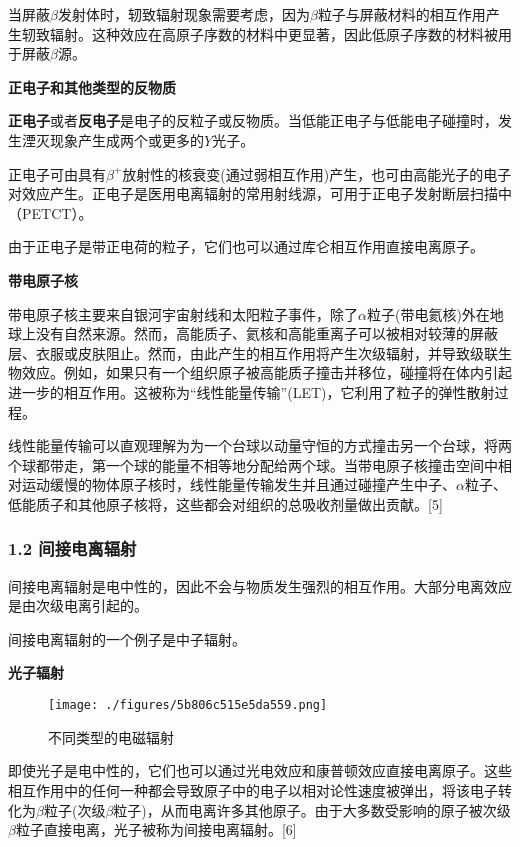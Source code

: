 当屏蔽$\beta$发射体时，轫致辐射现象需要考虑，因为$\beta$粒子与屏蔽材料的相互作用产生轫致辐射。这种效应在高原子序数的材料中更显著，因此低原子序数的材料被用于屏蔽$\beta$源。

\textbf{正电子和其他类型的反物质}

\textbf{正电子}或者\textbf{反电子}是电子的反粒子或反物质。当低能正电子与低能电子碰撞时，发生湮灭现象产生成两个或更多的$Y$光子。

正电子可由具有$\beta^+$放射性的核衰变(通过弱相互作用)产生，也可由高能光子的电子对效应产生。正电子是医用电离辐射的常用射线源，可用于正电子发射断层扫描中（PETCT）。

由于正电子是带正电荷的粒子，它们也可以通过库仑相互作用直接电离原子。

\textbf{带电原子核}

带电原子核主要来自银河宇宙射线和太阳粒子事件，除了$\alpha$粒子(带电氦核)外在地球上没有自然来源。然而，高能质子、氦核和高能重离子可以被相对较薄的屏蔽层、衣服或皮肤阻止。然而，由此产生的相互作用将产生次级辐射，并导致级联生物效应。例如，如果只有一个组织原子被高能质子撞击并移位，碰撞将在体内引起进一步的相互作用。这被称为“线性能量传输”(LET)，它利用了粒子的弹性散射过程。

线性能量传输可以直观理解为为一个台球以动量守恒的方式撞击另一个台球，将两个球都带走，第一个球的能量不相等地分配给两个球。当带电原子核撞击空间中相对运动缓慢的物体原子核时，线性能量传输发生并且通过碰撞产生中子、$\alpha$粒子、低能质子和其他原子核将，这些都会对组织的总吸收剂量做出贡献。[5]

\subsubsection{1.2 间接电离辐射}
间接电离辐射是电中性的，因此不会与物质发生强烈的相互作用。大部分电离效应是由次级电离引起的。

间接电离辐射的一个例子是中子辐射。

\textbf{光子辐射}

\begin{figure}[ht]
\centering
\texttt{[image: ./figures/5b806c515e5da559.png]}
\caption{不同类型的电磁辐射} \label{fig_DLFS_3}
\end{figure}
即使光子是电中性的，它们也可以通过光电效应和康普顿效应直接电离原子。这些相互作用中的任何一种都会导致原子中的电子以相对论性速度被弹出，将该电子转化为$\beta$粒子(次级$\beta$粒子)，从而电离许多其他原子。由于大多数受影响的原子被次级$\beta$粒子直接电离，光子被称为间接电离辐射。[6]

